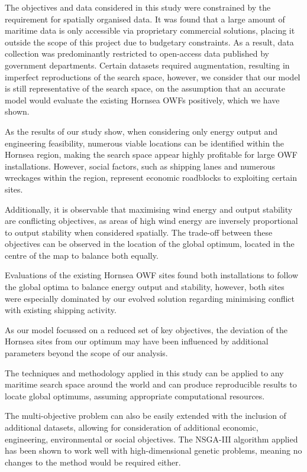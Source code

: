 \documentclass[preprint,12pt]{elsarticle}
\begin{document}
The objectives and data considered in this study were constrained by the requirement for spatially organised data. It was found that a large amount of maritime data is only accessible via proprietary commercial solutions, placing it outside the scope of this project due to budgetary constraints. As a result, data collection was predominantly restricted to open-access data published by government departments. Certain datasets required augmentation, resulting in imperfect reproductions of the search space, however, we consider that our model is still representative of the search space, on the assumption that an accurate model would evaluate the existing Hornsea OWFs positively, which we have shown.

As the results of our study show, when considering only energy output and engineering feasibility, numerous viable locations can be identified within the Hornsea region, making the search space appear highly profitable for large OWF installations. However, social factors, such as shipping lanes and numerous wreckages within the region, represent economic roadblocks to exploiting certain sites.

Additionally, it is observable that maximising wind energy and output stability are conflicting objectives, as areas of high wind energy are inversely proportional to output stability when considered spatially. The trade-off between these objectives can be observed in the location of the global optimum, located in the centre of the map to balance both equally.

Evaluations of the existing Hornsea OWF sites found both installations to follow the global optima to balance energy output and stability, however, both sites were especially dominated by our evolved solution regarding minimising conflict with existing shipping activity. 

As our model focussed on a reduced set of key objectives, the deviation of the Hornsea sites from our optimum may have been influenced by additional parameters beyond the scope of our analysis. 

The techniques and methodology applied in this study can be applied to any maritime search space around the world and can produce reproducible results to locate global optimums, assuming appropriate computational resources.

The multi-objective problem can also be easily extended with the inclusion of additional datasets, allowing for consideration of additional economic, engineering, environmental or social objectives. The NSGA-III algorithm applied has been shown to work well with high-dimensional genetic problems, meaning no changes to the method would be required either.
\end{document}
